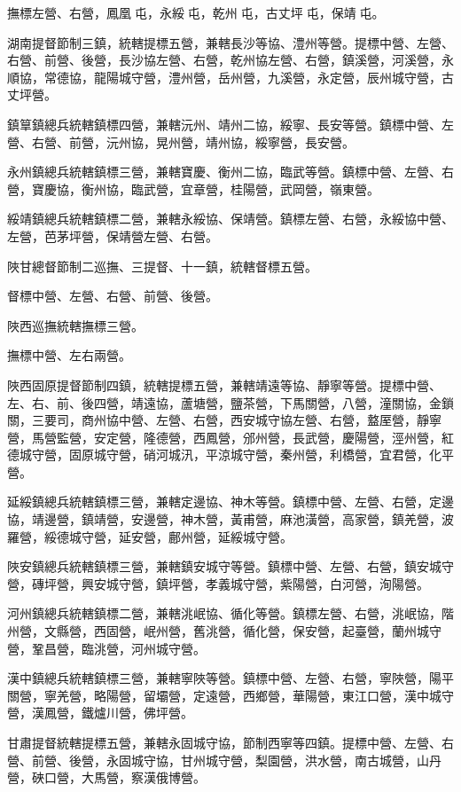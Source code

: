 \begin{pinyinscope}
撫標左營、右營，鳳凰屯，永綏屯，乾州屯，古丈坪屯，保靖屯。

湖南提督節制三鎮，統轄提標五營，兼轄長沙等協、澧州等營。提標中營、左營、右營、前營、後營，長沙協左營、右營，乾州協左營、右營，鎮溪營，河溪營，永順協，常德協，龍陽城守營，澧州營，岳州營，九溪營，永定營，辰州城守營，古丈坪營。

鎮筸鎮總兵統轄鎮標四營，兼轄沅州、靖州二協，綏寧、長安等營。鎮標中營、左營、右營、前營，沅州協，晃州營，靖州協，綏寧營，長安營。

永州鎮總兵統轄鎮標三營，兼轄寶慶、衡州二協，臨武等營。鎮標中營、左營、右營，寶慶協，衡州協，臨武營，宜章營，桂陽營，武岡營，嶺東營。

綏靖鎮總兵統轄鎮標二營，兼轄永綏協、保靖營。鎮標左營、右營，永綏協中營、左營，芭茅坪營，保靖營左營、右營。

陜甘總督節制二巡撫、三提督、十一鎮，統轄督標五營。

督標中營、左營、右營、前營、後營。

陜西巡撫統轄撫標三營。

撫標中營、左右兩營。

陜西固原提督節制四鎮，統轄提標五營，兼轄靖遠等協、靜寧等營。提標中營、左、右、前、後四營，靖遠協，蘆塘營，鹽茶營，下馬關營，八營，潼關協，金鎖關，三要司，商州協中營、左營、右營，西安城守協左營、右營，盩厔營，靜寧營，馬營監營，安定營，隆德營，西鳳營，邠州營，長武營，慶陽營，涇州營，紅德城守營，固原城守營，硝河城汛，平涼城守營，秦州營，利橋營，宜君營，化平營。

延綏鎮總兵統轄鎮標三營，兼轄定邊協、神木等營。鎮標中營、左營、右營，定邊協，靖邊營，鎮靖營，安邊營，神木營，黃甫營，麻池潢營，高家營，鎮羌營，波羅營，綏德城守營，延安營，鄜州營，延綏城守營。

陜安鎮總兵統轄鎮標三營，兼轄鎮安城守等營。鎮標中營、左營、右營，鎮安城守營，磚坪營，興安城守營，鎮坪營，孝義城守營，紫陽營，白河營，洵陽營。

河州鎮總兵統轄鎮標二營，兼轄洮岷協、循化等營。鎮標左營、右營，洮岷協，階州營，文縣營，西固營，岷州營，舊洮營，循化營，保安營，起臺營，蘭州城守營，鞏昌營，臨洮營，河州城守營。

漢中鎮總兵統轄鎮標三營，兼轄寧陜等營。鎮標中營、左營、右營，寧陜營，陽平關營，寧羌營，略陽營，留壩營，定遠營，西鄉營，華陽營，東江口營，漢中城守營，漢鳳營，鐵爐川營，佛坪營。

甘肅提督統轄提標五營，兼轄永固城守協，節制西寧等四鎮。提標中營、左營、右營、前營、後營，永固城守協，甘州城守營，梨園營，洪水營，南古城營，山丹營，硤口營，大馬營，察漢俄博營。


\end{pinyinscope}
